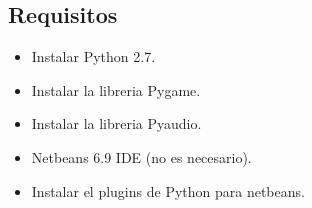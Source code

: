 \documentclass[a4paper,11pt]{article}
\begin{document}
    \subsection{ Requisitos}
\begin{itemize}
\item Instalar Python 2.7.
 \item Instalar la libreria Pygame.
 \item Instalar la libreria Pyaudio.
\item Netbeans 6.9 IDE (no es necesario).
\item Instalar el plugins de Python para netbeans.

\end{itemize}


\begin{figure}[ht!]
 

\end{figure}
\end{document}
